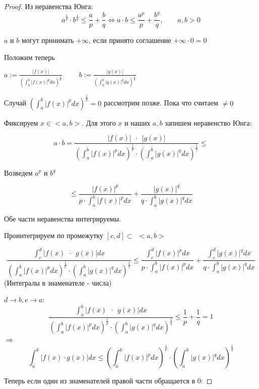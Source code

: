 \begin{proof}

    Из неравенства Юнга:
    \[ 
    a^{\frac{1}{p}} \cdot b^{\frac{1}{q}} \le \frac{a}{p} + \frac{b}{q} \Leftrightarrow 
    a \cdot b \le \frac{a^p}{p} +\frac{b^q}{q}, \qquad a, b > 0 
    \]
    \begin{remark}
        $a$ и $b$ могут принимать $+\infty$, если принято соглашение $+\infty \cdot 0 = 0$
    \end{remark}

    Положим теперь 
    
    $a := \frac{|f(x)|}{\left(\int^b_a |f(x)|^p dx \right)^{\frac{1}{p}}} \qquad$
    $b := \frac{|g(x)|}{\left(\int^b_a |g(x)|^q dx \right)^{\frac{1}{q}}}$

    Случай $\left(\int^b_a |f(x)|^p dx \right)^{\frac{1}{p}} = 0$ рассмотрим позже. Пока что считаем $\not = 0$

    Фиксируем $x \in <a, b>$. Для этого $x$ и наших $a, b$ запишем неравенство Юнга:

    \[
    a \cdot b = \frac{|f(x)| \ \ \cdot \ \ |g(x)|}
    { \left(\int^b_a |f(x)|^p dx \right)^{\frac{1}{p}} \cdot \left( \int^b_a |g(x)|^q dx \right)^{\frac{1}{q}} } \le 
    \]

    Возведем $a^p$ и $b^q$

    \[
    \le \frac{|f(x)|^p}{p\cdot \int^b_a |f(x)|^p dx } +
        \frac{|g(x)|^q}{q\cdot \int^b_a |g(x)|^q dx }
    \]

    Обе части неравенства интегрируемы.

    Проинтегрируем по промежутку $[c, d] \subset \ \ <a, b>$

    \[
    \frac{ \int^d_c |f(x) \ \ \cdot \ \ g(x)| dx } { \left(\int^b_a |f(x)|^p dx \right)^{\frac{1}{p}} \cdot \left( \int^b_a |g(x)|^q dx \right)^{\frac{1}{q}} } \le 
    \frac{\int^d_c |f(x)|^p dx }{p\cdot \int^b_a |f(x)|^p dx } + \frac{\int^d_c |g(x)|^q dx}{q\cdot\int^b_a |g(x)|^q dx }
    \]
    (Интегралы в знаменателе - числа)

    $d \longrightarrow b, c \longrightarrow a:$
    \[
    \frac{ \int^b_a |f(x) \ \ \cdot \ \ g(x)| dx } { \left(\int^b_a |f(x)|^p dx \right)^{\frac{1}{p}} \cdot \left( \int^b_a |g(x)|^q dx \right)^{\frac{1}{q}}}
    \le \frac{1}{p} + \frac{1}{q} = 1
    \]
    $\Rightarrow$
    \[
    \int^b_a |f(x) \cdot g(x)| dx \le  \left(\int^b_a |f(x)|^p dx \right)^{\frac{1}{p}} \cdot \left( \int^b_a |g(x)|^q dx \right)^{\frac{1}{q}}
    \]

    Теперь если один из знаменателей правой части обращается в 0:


\end{proof}
